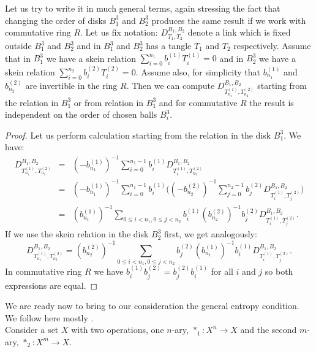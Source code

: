 \documentclass[12pt]{amsart}
\begin{document}
Let us try to write it in much general terms, again stressing the fact that changing the order of disks $B_1^3$ and $B_2^3$ produces the same result if we work with 
commutative ring $R$. Let us fix notation: $D^{B_1,B_2}_{T_1,T_2}$ denote a link 
which is fixed outside $B_1^3$ and $B_2^3$ and in $B_1^3$ and $B_2^3$ has a tangle 
$T_1$ and $T_2$ respectively. Assume that in $B_1^3$ we have a skein relation 
$\sum_{i=0}^{n_1} b_i^{(1)}T_i^{(1)}=0$ and in $B_2^3$ we have a skein relation 
$\sum_{i=0}^{n_2} b_i^{(2)}T_i^{(2)}=0$. Assume also, for simplicity that 
$b_{n_1}^{(1)}$ and $b_{n_2}^{(2)}$ are invertible in the ring $R$. Then we can 
compute $D^{B_1,B_2}_{T_{n_1}^{(1)},T_{n_2}^{(2)}}$ starting from the relation in $B_1^3$ or from relation in $B_1^3$ and for commutative $R$ the result is independent on the order of chosen balls $B_i^3$.
\begin{proof}
Let us perform calculation starting from the relation in the disk $B_1^3$. We have:
\begin{eqnarray*}
D^{B_1,B_2}_{T_{n_1}^{(1)},T_{n_2}^{(2)}} &=& (-b_{n_1}^{(1)})^{-1}\sum_{i=0}^{n_1-1} b_i^{(1)}D^{B_1,B_2}_{T_{i}^{(1)},T_{n_2}^{(2)}}\\
&=& (-b_{n_1}^{(1)})^{-1}\sum_{i=0}^{n_1-1} b_i^{(1)}\bigg((-b_{n_2}^{(2)})^{-1}\sum_{j=0}^{n_2-1} b_j^{(2)}D^{B_1,B_2}_{T_{i}^{(1)},T_{j}^{(2)}}\bigg)\\
&=& (b_{n_1}^{(1)})^{-1}\sum_{0\leq i < n_1, 0\leq j < n_2}b_i^{(1)}(b_{n_2}^{(2)})^{-1}b_j^{(2)}D^{B_1,B_2}_{T_{i}^{(1)},T_{j}^{(2)}}.
\end{eqnarray*}
If we use the skein relation in the disk $B_2^3$ first, we get analogously:
\begin{equation*}
D^{B_1,B_2}_{T_{n_1}^{(1)},T_{n_2}^{(2)}}= (b_{n_2}^{(2)})^{-1}\sum_{0\leq i < n_1, 0\leq j < n_2}b_j^{(2)}(b_{n_1}^{(1)})^{-1}b_i^{(1)}D^{B_1,B_2}_{T_{i}^{(1)},T_{j}^{(2)}}.  
\end{equation*}
In commutative ring $R$ we have $b_i^{(1)}b_j^{(2)}=b_j^{(2)}b_i^{(1)}$ for all $i$ and $j$ so both expressions are equal.
\end{proof}
We are ready now to bring to our consideration the general entropy condition. 
We follow here mostly \cite{SmRo,RoSm}.\\
Consider a set $X$ with two operations, one $n$-ary, $*_1: X^n \to X$ and the second $m$-ary, $*_2: X^m \to X$.
\end{document}
